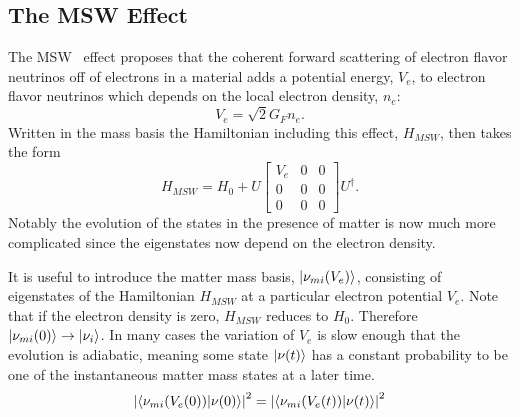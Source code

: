 \subsection{The MSW Effect}

The MSW~\cite{wolfenstein,mikheyev} effect proposes that the coherent forward scattering of electron flavor neutrinos off of electrons in a material adds a potential energy, $V_e$, to electron flavor neutrinos which depends on the local electron density, $n_e$:
\begin{equation}
V_e = \sqrt{2} G_F n_e.
\end{equation}
Written in the mass basis the Hamiltonian including this effect, $H_{MSW}$, then takes the form
\begin{equation}
H_{MSW} = H_{0} + U\begin{bmatrix}
V_e & 0 & 0 \\
0 & 0 & 0 \\
0 & 0 & 0
\end{bmatrix}U^\dagger.
\label{eq:msw}
\end{equation}
Notably the evolution of the states in the presence of matter is now much more complicated since the eigenstates now depend on the electron density.

It is useful to introduce the matter mass basis, $\ket{\nu_{mi}(V_e)}$, consisting of eigenstates of the Hamiltonian $H_{MSW}$ at a particular electron potential $V_e$.
Note that if the electron density is zero, $H_{MSW}$ reduces to $H_0$. Therefore $\ket{\nu_{mi}(0)} \rightarrow \ket{\nu_{i}}$.
In many cases the variation of $V_e$ is slow enough that the evolution is adiabatic, meaning some state $\ket{\nu(t)}$ has a constant probability to be one of the instantaneous matter mass states at a later time. 
\begin{equation}
\left| \braket{\nu_{mi}(V_e(0))}{\nu(0)} \right|^2 = \left| \braket{\nu_{mi}(V_e(t))}{\nu(t)} \right |^2
\end{equation}

